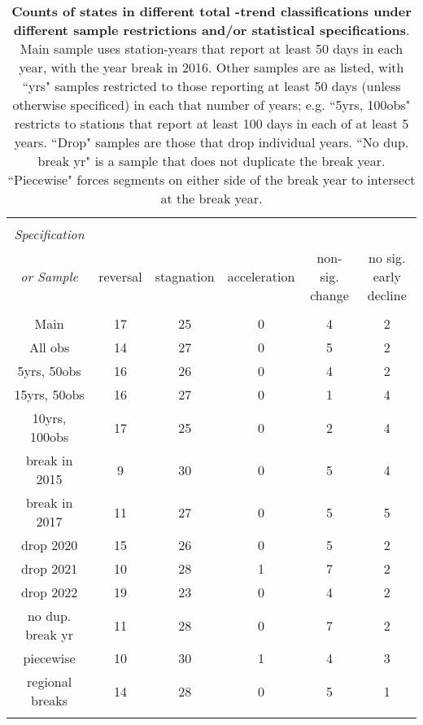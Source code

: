 
\begin{table}[!htbp] \centering 
  \caption{\textbf{Counts of states in different total \pmt-trend classifications under different sample restrictions and/or statistical specifications}. Main sample uses station-years that report at least 50 days in each year, with the year break in 2016. Other samples are as listed,  with ``yrs" samples restricted to those reporting at least 50 days (unless otherwise specificed) in each that number of years; e.g. ``5yrs, 100obs" restricts to stations that report at least 100 days in each of at least 5 years. ``Drop" samples are those that drop individual years. ``No dup. break yr" is a sample that does not duplicate the break year. ``Piecewise" forces segments on either side of the break year to intersect at the break year.} 
  \label{table:pmtrends} 
\footnotesize 
\begin{tabular}{@{\extracolsep{5pt}} cccccc} 
\\[-1.8ex]\hline 
\hline \\[-1.8ex] 
\textit{Specification} \\ 
                  \textit{or Sample} & reversal & stagnation & acceleration & non-sig. change & no sig. early decline \\ 
\hline \\[-1.8ex] 
Main & 17 & 25 & 0 & 4 & 2 \\ 
All obs & 14 & 27 & 0 & 5 & 2 \\ 
5yrs, 50obs & 16 & 26 & 0 & 4 & 2 \\ 
15yrs, 50obs & 16 & 27 & 0 & 1 & 4 \\ 
10yrs, 100obs & 17 & 25 & 0 & 2 & 4 \\ 
break in 2015 & 9 & 30 & 0 & 5 & 4 \\ 
break in 2017 & 11 & 27 & 0 & 5 & 5 \\ 
drop 2020 & 15 & 26 & 0 & 5 & 2 \\ 
drop 2021 & 10 & 28 & 1 & 7 & 2 \\ 
drop 2022 & 19 & 23 & 0 & 4 & 2 \\ 
no dup. break yr & 11 & 28 & 0 & 7 & 2 \\ 
piecewise & 10 & 30 & 1 & 4 & 3 \\ 
regional breaks & 14 & 28 & 0 & 5 & 1 \\ 
\hline \\[-1.8ex] 
\end{tabular} 
\end{table} 
